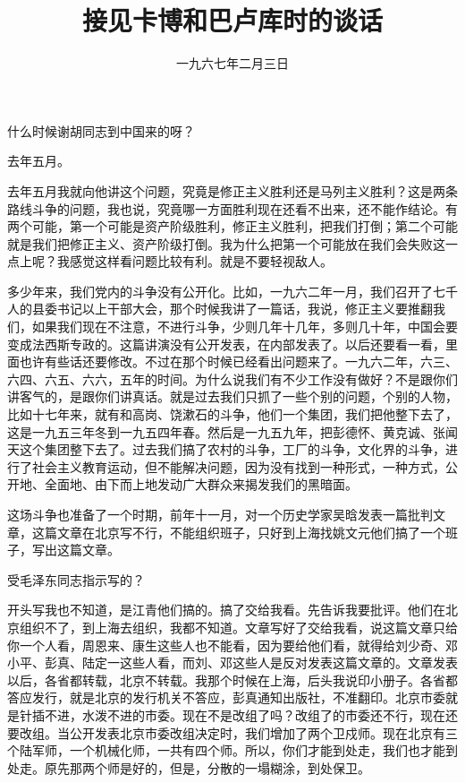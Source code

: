
\title{接见卡博和巴卢库时的谈话}
\date{一九六七年二月三日}
\maketitle


什么时候谢胡同志到中国来的呀？

去年五月。

去年五月我就向他讲这个问题，究竟是修正主义胜利还是马列主义胜利？这是两条路线斗争的问题，我也说，究竟哪一方面胜利现在还看不出来，还不能作结论。有两个可能，第一个可能是资产阶级胜利，修正主义胜利，把我们打倒；第二个可能就是我们把修正主义、资产阶级打倒。我为什么把第一个可能放在我们会失败这一点上呢？我感觉这样看问题比较有利。就是不要轻视敌人。

多少年来，我们党内的斗争没有公开化。比如，一九六二年一月，我们召开了七千人的县委书记以上干部大会，那个时候我讲了一篇话，我说，修正主义要推翻我们，如果我们现在不注意，不进行斗争，少则几年十几年，多则几十年，中国会要变成法西斯专政的。这篇讲演没有公开发表，在内部发表了。以后还要看一看，里面也许有些话还要修改。不过在那个时候已经看出问题来了。一九六二年，六三、六四、六五、六六，五年的时间。为什么说我们有不少工作没有做好？不是跟你们讲客气的，是跟你们讲真话。就是过去我们只抓了一些个别的问题，个别的人物，比如十七年来，就有和高岗、饶漱石的斗争，他们一个集团，我们把他整下去了，这是一九五三年冬到一九五四年春。然后是一九五九年，把彭德怀、黄克诚、张闻天这个集团整下去了。过去我们搞了农村的斗争，工厂的斗争，文化界的斗争，进行了社会主义教育运动，但不能解决问题，因为没有找到一种形式，一种方式，公开地、全面地、由下而上地发动广大群众来揭发我们的黑暗面。

这场斗争也准备了一个时期，前年十一月，对一个历史学家吴晗发表一篇批判文章，这篇文章在北京写不行，不能组织班子，只好到上海找姚文元他们搞了一个班子，写出这篇文章。

受毛泽东同志指示写的？

开头写我也不知道，是江青他们搞的。搞了交给我看。先告诉我要批评。他们在北京组织不了，到上海去组织，我都不知道。文章写好了交给我看，说这篇文章只给你一个人看，周恩来、康生这些人也不能看，因为要给他们看，就得给刘少奇、邓小平、彭真、陆定一这些人看，而刘、邓这些人是反对发表这篇文章的。文章发表以后，各省都转载，北京不转载。我那个时候在上海，后头我说印小册子。各省都答应发行，就是北京的发行机关不答应，彭真通知出版社，不准翻印。北京市委就是针插不进，水泼不进的市委。现在不是改组了吗？改组了的市委还不行，现在还要改组。当公开发表北京市委改组决定时，我们增加了两个卫戍师。现在北京有三个陆军师，一个机械化师，一共有四个师。所以，你们才能到处走，我们也才能到处走。原先那两个师是好的，但是，分散的一塌糊涂，到处保卫。

